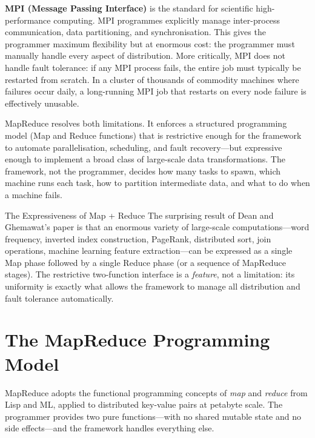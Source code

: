 \textbf{MPI (Message Passing Interface)} is the standard for
scientific high-performance computing. MPI programmes explicitly manage
inter-process communication, data partitioning, and synchronisation.
This gives the programmer maximum flexibility but at enormous cost: the
programmer must manually handle every aspect of distribution. More
critically, MPI does not handle fault tolerance: if any MPI process
fails, the entire job must typically be restarted from scratch. In a
cluster of thousands of commodity machines where failures occur daily,
a long-running MPI job that restarts on every node failure is
effectively unusable.

MapReduce resolves both limitations. It enforces a structured
programming model (Map and Reduce functions) that is restrictive
enough for the framework to automate parallelisation, scheduling, and
fault recovery---but expressive enough to implement a broad class of
large-scale data transformations. The framework, not the programmer,
decides how many tasks to spawn, which machine runs each task, how
to partition intermediate data, and what to do when a machine fails.

\begin{keyinsight}{The Expressiveness of Map + Reduce}
The surprising result of Dean and Ghemawat's paper is that an
enormous variety of large-scale computations---word frequency,
inverted index construction, PageRank, distributed sort, join
operations, machine learning feature extraction---can be expressed
as a single Map phase followed by a single Reduce phase (or a
sequence of MapReduce stages). The restrictive two-function interface
is a \emph{feature}, not a limitation: its uniformity is exactly what
allows the framework to manage all distribution and fault tolerance
automatically.
\end{keyinsight}

\section{The MapReduce Programming Model}
\label{sec:mr-model}

MapReduce adopts the functional programming concepts of \emph{map} and
\emph{reduce} from Lisp and ML, applied to distributed key-value pairs
at petabyte scale. The programmer provides two pure functions---with no
shared mutable state and no side effects---and the framework handles
everything else.


